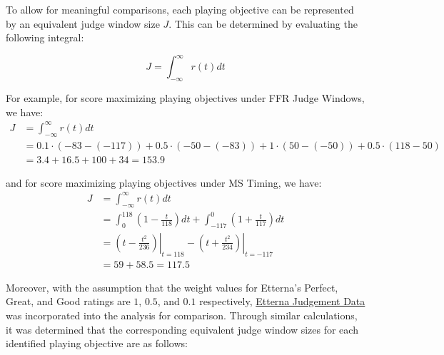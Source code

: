 To allow for meaningful comparisons, each playing objective can be represented by an equivalent judge window size $J$. This can be determined by evaluating the following integral:

$$J = \displaystyle \int_{-\infty}^{\infty} r(t) dt$$

For example, for score maximizing playing objectives under FFR Judge Windows, we have:
\begin{align*}
J &= \displaystyle \int_{-\infty}^{\infty} r(t) dt \\
& = 0.1 \cdot (-83 - (-117)) + 0.5 \cdot (-50 - (-83)) + 1 \cdot (50 - (-50)) + 0.5 \cdot (118 - 50) \\
&= 3.4 + 16.5 + 100 + 34 = 153.9
\end{align*}

and for score maximizing playing objectives under MS Timing, we have:
\begin{align*}
J &= \displaystyle \int_{-\infty}^{\infty} r(t) dt \\
& = \int_{0}^{118} \left(1 - \frac{t}{118}\right) dt + \int_{-117}^{0} \left(1 + \frac{t}{117}\right) dt \\
&= \left. \left( t - \frac{t^2}{236} \right)\right|_{t = 118} - \left.\left( t + \frac{t^2}{234} \right) \right|_{t = - 117} \\
&= 59 + 58.5 = 117.5
\end{align*}

Moreover, with the assumption that the weight values for Etterna's Perfect, Great, and Good ratings are $1$, $0.5$, and $0.1$ respectively, \href{https://docs.google.com/spreadsheets/d/1syi5aN6sTiDA2Bs_lzZjsLQ1yCEhxl5EnAd6EsD6cF4/edit?gid=0#gid=0}{Etterna Judgement Data} was incorporated into the analysis for comparison. Through similar calculations, it was determined that the corresponding equivalent judge window sizes for each identified playing objective are as follows:

